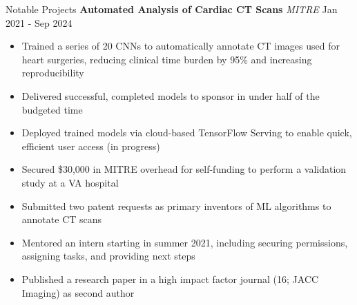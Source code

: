 \documentclass{resume} %
\begin{document}
\begin{rSection}{Notable Projects}
\textbf{Automated Analysis of Cardiac CT Scans} \textit{MITRE}
\hfill Jan 2021 - Sep 2024
\begin{itemize}
    \item Trained a series of 20 CNNs to automatically annotate CT images used for heart surgeries, reducing clinical time burden by 95\% and increasing reproducibility
    \item Delivered successful, completed models to sponsor in under half of the budgeted time
    \item Deployed trained models via cloud-based TensorFlow Serving to enable quick, efficient user access (in progress)
    \item Secured \$30,000 in MITRE overhead for self-funding to perform a validation study at a VA hospital
    \item Submitted two patent requests as primary inventors of ML algorithms to annotate CT scans
    \item Mentored an intern starting in summer 2021, including securing permissions, assigning tasks, and providing next steps
    \item Published a research paper in a high impact factor journal (16; JACC Imaging) as second author
\end{itemize}

\begin{comment}
\textbf{Automated Pre-procedural Analysis for TAVR Surgeries} \textit{MITRE}
\hfill Jan 2023 - Present
\begin{itemize}
    \item Trained a series of 20 CNNs to automatically annotate CT images used for heart surgeries, reducing clinical time burden by 75\% and increasing reproducibility
    \item Successfully completed the project on time, despite an unexpected halving of the budget
    \item Coded a robust geometrical library in Python to resample images and positions in 2D and 3D, including rotations and shifts
    \item Coordinated with VA Palo Alto and a Canadian heart hospital to validate algorithms on external cohort
    \item Secured \$30,000 in MITRE overhead to fund my time to perform the validation study at a VA hospital
    \item Submitted a patent request as primary inventor for ML algorithms to annotate CT scans (in progress)
\end{itemize}
\end{comment}


\end{rSection}
\end{document}

